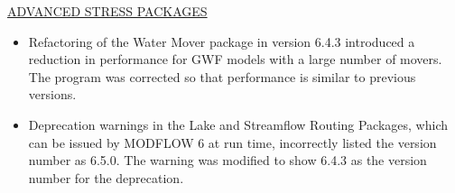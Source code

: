 	
	\item \currentmodflowversion
	





	\underline{ADVANCED STRESS PACKAGES}
	\begin{itemize}
		\item Refactoring of the Water Mover package in version 6.4.3 introduced a reduction in performance for GWF models with a large number of movers.  The program was corrected so that performance is similar to previous versions.
		\item Deprecation warnings in the Lake and Streamflow Routing Packages, which can be issued by MODFLOW 6 at run time, incorrectly listed the version number as 6.5.0.  The warning was modified to show 6.4.3 as the version number for the deprecation.
	\end{itemize}

